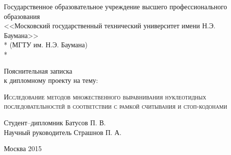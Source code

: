 \begin{titlepage}
\newpage

\begin{center}
Государственное образовательное учреждение высшего профессионального образования \\
\vspace{1cm}
\Large<<Московский государственный технический университет имени Н.Э. Баумана>> \\*
(МГТУ им. Н.Э. Баумана) \\*
\hrulefill
\end{center}


\vspace{8em}

\begin{center}
\Large Пояснительная записка \\ к дипломному проекту на тему:
\end{center}

\vspace{2.0em}

\begin{center}
	\Large
\textsc{Исследование методов множественного выравнивания нуклеотидных последовательностей в соответствии с рамкой считывания и стоп-кодонами}
\end{center}

\vspace{6em}

\begin{flushleft}
Студент--дипломник \hrulefill Батусов П. В. \\
\vspace{1.5em}
Научный руководитель \hrulefill Страшнов П. А.\\
\vspace{1.5em}
\end{flushleft}

\vspace{\fill}

\begin{center}
Москва 2015
\end{center}

\end{titlepage}